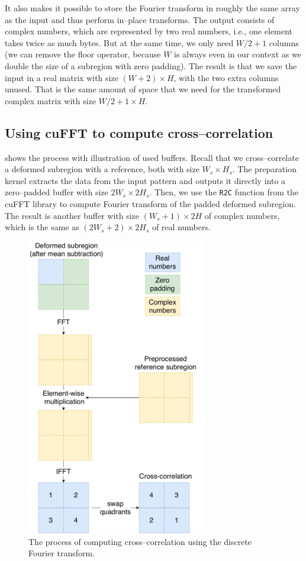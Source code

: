 It also makes it possible to store the Fourier transform in roughly the same array as the input and thus perform in--place transforms. The output consists of complex numbers, which are represented by two real numbers, i.e., one element takes twice as much bytes. But at the same time, we only need $W/2 + 1$ columns (we can remove the floor operator, because $W$ is always even in our context as we double the size of a subregion with zero padding). The result is that we save the input in a real matrix with size $(W+2) \times H$, with the two extra columns unused. That is the same amount of space that we need for the transformed complex matrix with size $W/2 + 1 \times H$.

\subsection{Using cuFFT to compute cross--correlation}

 shows the process with illustration of used buffers. Recall that we cross--correlate a deformed subregion with a reference, both with size $W_s \times H_s$. The preparation kernel extracts the data from the input pattern and outputs it directly into a zero--padded buffer with size $2W_s \times 2H_s$. Then, we use the \texttt{R2C} function from the cuFFT library to compute Fourier transform of the padded deformed subregion. The result is another buffer with size $(W_s + 1) \times 2H$ of complex numbers, which is the same as $(2W_s+2) \times 2H_s$ of real numbers.

\begin{figure}
	\centering
	\includegraphics[width=0.7\textwidth]{img/fft-impl}
	\caption{The process of computing cross--correlation using the discrete Fourier transform.}
	\label{fft-impl}
\end{figure}

